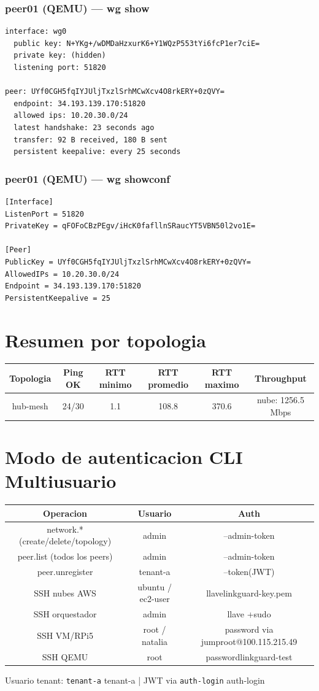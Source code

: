 \documentclass[11pt,a4paper]{article}
\begin{document}
\subsubsection*{peer01 (QEMU) — wg show}
\begin{lstlisting}
interface: wg0
  public key: N+YKg+/wDMDaHzxurK6+Y1WQzP553tYi6fcP1er7ciE=
  private key: (hidden)
  listening port: 51820

peer: UYf0CGH5fqIYJUljTxzlSrhMCwXcv4O8rkERY+0zQVY=
  endpoint: 34.193.139.170:51820
  allowed ips: 10.20.30.0/24
  latest handshake: 23 seconds ago
  transfer: 92 B received, 180 B sent
  persistent keepalive: every 25 seconds

\end{lstlisting}

\subsubsection*{peer01 (QEMU) — wg showconf}
\begin{lstlisting}
[Interface]
ListenPort = 51820
PrivateKey = qFOFoCBzPEgv/iHcK0fafllnSRaucYT5VBN50l2vo1E=

[Peer]
PublicKey = UYf0CGH5fqIYJUljTxzlSrhMCwXcv4O8rkERY+0zQVY=
AllowedIPs = 10.20.30.0/24
Endpoint = 34.193.139.170:51820
PersistentKeepalive = 25

\end{lstlisting}

\section{Resumen por topologia}
\begin{longtable}{|c|c|c|c|c|c|}
\hline
Topologia & Ping OK & RTT minimo & RTT promedio & RTT maximo & Throughput \\ \hline
hub-mesh & 24/30 & 1.1 & 108.8 & 370.6 & nube: 1256.5 Mbps \\ \hline
\end{longtable}

\section{Modo de autenticacion CLI Multiusuario}
\begin{longtable}{|c|c|c|}
\hline
Operacion & Usuario & Auth \\ \hline
network.* (create/delete/topology) & admin & --admin-token \\ \hline
peer.list (todos los peers) & admin & --admin-token \\ \hline
peer.unregister & tenant-a & --token(JWT) \\ \hline
SSH nubes AWS & ubuntu / ec2-user & llavelinkguard-key.pem \\ \hline
SSH orquestador & admin & llave +sudo \\ \hline
SSH VM/RPi5 & root / natalia & password via jumproot@100.115.215.49 \\ \hline
SSH QEMU & root & passwordlinkguard-test \\ \hline
\end{longtable}

Usuario tenant:  \texttt{tenant-a} tenant-a  | JWT via  \texttt{auth-login} auth-login\\
\end{document}
